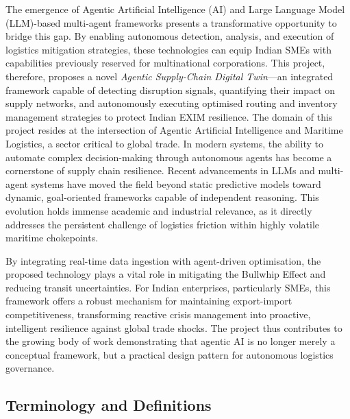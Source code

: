 The emergence of Agentic Artificial Intelligence (AI) and Large Language Model (LLM)-based multi-agent frameworks presents a transformative opportunity to bridge this gap. By enabling autonomous detection, analysis, and execution of logistics mitigation strategies, these technologies can equip Indian SMEs with capabilities previously reserved for multinational corporations. This project, therefore, proposes a novel \textit{Agentic Supply-Chain Digital Twin}---an integrated framework capable of detecting disruption signals, quantifying their impact on supply networks, and autonomously executing optimised routing and inventory management strategies to protect Indian EXIM resilience.
The domain of this project resides at the intersection of Agentic Artificial Intelligence and Maritime Logistics, a sector critical to global trade. In modern systems, the ability to automate complex decision-making through autonomous agents has become a cornerstone of supply chain resilience. Recent advancements in \gls{LLM}s and multi-agent systems have moved the field beyond static predictive models toward dynamic, goal-oriented frameworks capable of independent reasoning. This evolution holds immense academic and industrial relevance, as it directly addresses the persistent challenge of logistics friction within highly volatile maritime chokepoints.

By integrating real-time data ingestion with agent-driven optimisation, the proposed technology plays a vital role in mitigating the Bullwhip Effect and reducing transit uncertainties. For Indian enterprises, particularly \gls{SME}s, this framework offers a robust mechanism for maintaining export-import competitiveness, transforming reactive crisis management into proactive, intelligent resilience against global trade shocks. The project thus contributes to the growing body of work demonstrating that agentic AI is no longer merely a conceptual framework, but a practical design pattern for autonomous logistics governance.

\subsection[Terminology and Definitions]{\textbf{Terminology and Definitions}}

